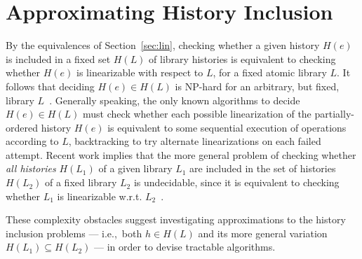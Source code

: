 \section{Approximating History Inclusion}
\label{sec:counting}

By the equivalences of Section~\ref{sec:lin}, checking whether a given history
$H(e)$ is included in a fixed set $H(L)$ of library histories is equivalent to
checking whether $H(e)$ is linearizable with respect to $L$, for a fixed atomic
library $L$. It follows that deciding $H(e) \in H(L)$ is NP-hard for an
arbitrary, but fixed, library $L$~\cite{journals/siamcomp/GibbonsK97}.
Generally speaking, the only known algorithms to decide $H(e) \in H(L)$ must
check whether each possible linearization of the partially-ordered history
$H(e)$ is equivalent to some sequential execution of operations according to
$L$, backtracking to try alternate linearizations on each failed attempt.
Recent work implies that the more general problem of checking whether \emph{all
histories} $H(L_1)$ of a given library $L_1$ are included in the set of histories $H(L_2)$
of a fixed library $L_2$ is undecidable, since it is equivalent to checking whether $L_1$ is
linearizable w.r.t. $L_2$~\cite{conf/esop/BouajjaniEEH13}.

These complexity obstacles suggest investigating approximations to the history
inclusion problems --- i.e.,~both $h \in H(L)$ and its more general variation
$H(L_1) \subseteq H(L_2)$ --- in order to devise tractable algorithms.


